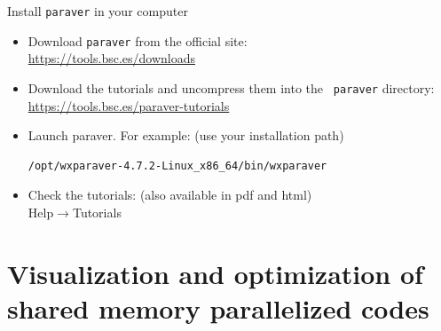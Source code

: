 \documentclass[10pt,xcolor=table]{beamer}
\begin{document}
\begin{frame}[fragile]{Install {\tt paraver} in your computer}
  \begin{itemize}
  \item Download {\tt paraver} from the official site:\\
    \hfil \url{https://tools.bsc.es/downloads}
  \item Download the tutorials and uncompress them into the {\tt
      paraver} directory:\\
    \hfil \url{https://tools.bsc.es/paraver-tutorials}
  \item Launch paraver. For example: (use your installation path)
    \begin{lstlisting}[style=shell,gobble=3]
      /opt/wxparaver-4.7.2-Linux_x86_64/bin/wxparaver
    \end{lstlisting}
  \item Check the tutorials: {\small (also available in pdf and html)}\\
    \hfil Help$\rightarrow$Tutorials
  \end{itemize}
\end{frame}




\section{Visualization and optimization of shared memory parallelized codes}
\end{document}

